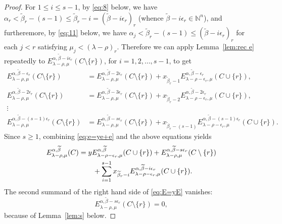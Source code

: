 \documentclass[12pt]{amsart}
\numberwithin{equation}{section}
\theoremstyle{definition}
\newcommand\wb{\widetilde{\beta}}
\newcommand\NN{\mathbb{N}}
\begin{document}
\begin{proof}
For $1\le i\le s-1$, by \eqref{eq:8} below, we have $\alpha_r < \wb_r-(s-1) \le
\wb_r-i =(\wb-i\epsilon_r)_r$
(whence $\wb-i\epsilon_r \in \NN^n$),
and furtheremore, by \eqref{eq:11} below, we
have
$\alpha_j<\wb_r-(s-1)\le (\wb-i\epsilon_r)_r$ for each $j<r$
satisfying
$\mu_j<(\lambda-\rho)_r$. Therefore we can apply Lemma~\ref{lem:rec e}
repeatedly to $E^{\alpha,\wb-i\epsilon_r}_{\lambda-\rho,\mu}(C\setminus\{r\})$,
for $i=1,2,\dots,s-1$, to get
  \begin{align*}
   E_{\lambda-\rho,\mu}^{\alpha,\wb-\epsilon_r}(C\setminus\{r\})
   &= E_{\lambda-\rho,\mu}^{\alpha,\wb-2\epsilon_r}(C\setminus\{r\})
       +x_{\wb_r-1} E_{\lambda-\rho-\epsilon_r,\mu}^{\alpha,\wb-\epsilon_r}(C\cup\{r\}),\\
   E_{\lambda-\rho,\mu}^{\alpha,\wb-2\epsilon_r}(C\setminus\{r\})
   &= E_{\lambda-\rho,\mu}^{\alpha,\wb-3\epsilon_r}(C\setminus\{r\})
     +x_{\wb_r-2} E_{\lambda-\rho-\epsilon_r,\mu}^{\alpha,\wb-2\epsilon_r}(C\cup\{r\}),\\
    \vdots\\
   E_{\lambda-\rho,\mu}^{\alpha,\wb-(s-1)\epsilon_r}(C\setminus\{r\})
   &= E_{\lambda-\rho,\mu}^{\alpha,\wb-s\epsilon_r}(C\setminus\{r\})
     +x_{\wb_r-(s-1)} E_{\lambda-\rho-\epsilon_r,\mu}^{\alpha,\wb-(s-1)\epsilon_r}(C\cup\{r\}).
  \end{align*}
  Since $s\ge1$, combining \eqref{eq:e=ye+e} and the above equations yields
\begin{align}\label{eq:E=yE}
E^{\alpha,\wb}_{\lambda-\rho,\mu}(C)
   &= y E^{\alpha,\wb}_{\lambda-\rho-\epsilon_r,\mu}(C\cup\{r\})
  +E_{\lambda-\rho,\mu}^{\alpha,\wb-s\epsilon_r}(C\setminus\{r\}) \\
  \notag &\qquad + \sum_{i=1}^{s-1}
       x_{\wb_r-i} E_{\lambda-\rho-\epsilon_r,\mu}^{\alpha,\wb-i\epsilon_r}(C\cup\{r\}).
  \end{align}
  The second summand of the right hand side of \eqref{eq:E=yE} vanishes:
  \begin{equation}\label{eq:ECr=0}
E_{\lambda-\rho,\mu}^{\alpha,\wb-s\epsilon_r}(C\setminus\{r\}) = 0,
  \end{equation}
  because of Lemma~\ref{lem:s} below.


\end{proof}
\end{document}
